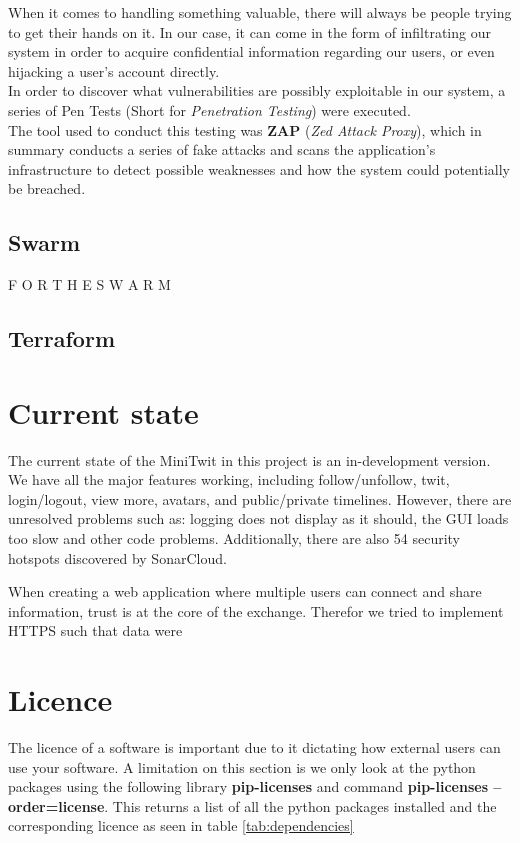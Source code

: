 When it comes to handling something valuable, there will always be people trying to get their hands on it.
In our case, it can come in the form of infiltrating our system in order to acquire confidential information regarding our users, or even hijacking a user's account directly.
\\
In order to discover what vulnerabilities are possibly exploitable in our system, a series of Pen Tests (Short for \textit{Penetration Testing}) were executed.
\\
The tool used to conduct this testing was \textbf{ZAP} (\textit{Zed Attack Proxy}), which in summary conducts a series of fake attacks and scans the application's infrastructure to detect possible weaknesses and how the system could potentially be breached.%

\subsection*{Swarm}

F O R   T H E   S W A R M

\subsection*{Terraform}



\section*{Current state}

The current state of the MiniTwit in this project is an in-development version. We have all the major features working, including follow/unfollow, twit, login/logout, view more, avatars, and public/private timelines. However, there are unresolved problems such as: logging does not display as it should, the GUI loads too slow and other code problems. Additionally, there are also 54 security hotspots discovered by SonarCloud.

When creating a web application where multiple users can connect and share information, trust is at the core of the exchange. Therefor we tried to implement HTTPS such that data were 



\section*{Licence}

The licence of a software is important due to it dictating how external users can use your software. A limitation on this section is we only look at the python packages using the following library \textbf{pip-licenses} and command \textbf{ pip-licenses --order=license}. This returns a list of all the python packages installed and the corresponding licence as seen in table \ref{tab:dependencies}

